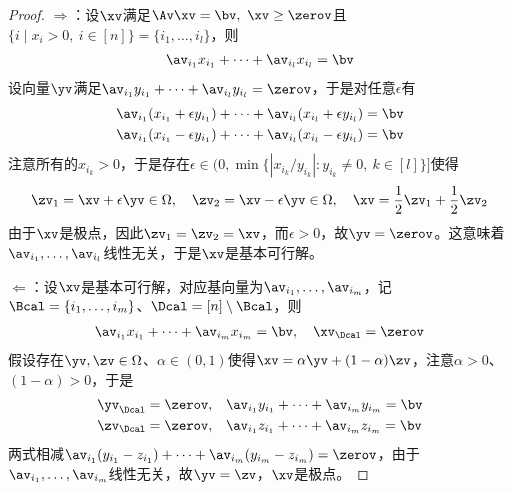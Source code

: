\documentclass{ctexart}
\begin{document}
\begin{proof}
    $\Rightarrow$：设$\xv$满足$\Av \xv = \bv, ~ \xv \ge \zerov$且$\{ i \mid x_i > 0, ~ i \in [n] \} = \{ i_1, \ldots, i_l \}$，则
    \begin{align*}
        \av_{i_1} x_{i_1} + \cdots + \av_{i_l} x_{i_l} = \bv
    \end{align*}
    设向量$\yv$满足$\av_{i_1} y_{i_1} + \cdots + \av_{i_l} y_{i_l} = \zerov$，于是对任意$\epsilon$有
    \begin{align*}
        \av_{i_1} (x_{i_1} + \epsilon y_{i_1}) + \cdots + \av_{i_l} (x_{i_l} + \epsilon y_{i_l}) & = \bv \\
        \av_{i_1} (x_{i_1} - \epsilon y_{i_1}) + \cdots + \av_{i_l} (x_{i_l} - \epsilon y_{i_l}) & = \bv
    \end{align*}
    注意所有的$x_{i_k}>0$，于是存在$\epsilon \in (0, \min\{ | x_{i_k} / y_{i_k} | : y_{i_k} \ne 0, ~ k \in [l] \}]$使得
    \begin{align*}
        \zv_1 = \xv + \epsilon \yv \in \Omega, \quad \zv_2 = \xv - \epsilon \yv \in \Omega, \quad \xv = \frac{1}{2} \zv_1 + \frac{1}{2} \zv_2
    \end{align*}
    由于$\xv$是极点，因此$\zv_1 = \zv_2 = \xv$，而$\epsilon > 0$，故$\yv = \zerov$。这意味着$\av_{i_1}, \ldots, \av_{i_l}$线性无关，于是$\xv$是基本可行解。

    $\Leftarrow$：设$\xv$是基本可行解，对应基向量为$\av_{i_1}, \ldots, \av_{i_m}$，记$\Bcal = \{i_1, \ldots, i_m\}$、$\Dcal = [n] \setminus \Bcal$，则
    \begin{align*}
        \av_{i_1} x_{i_1} + \cdots + \av_{i_m} x_{i_m} = \bv, \quad \xv_\Dcal = \zerov
    \end{align*}
    假设存在$\yv, \zv \in \Omega$、$\alpha \in (0,1)$使得$\xv = \alpha \yv + (1 - \alpha)\zv$，注意$\alpha > 0$、$(1- \alpha) > 0$，于是
    \begin{align*}
        \yv_\Dcal = \zerov, \quad & \av_{i_1} y_{i_1} + \cdots + \av_{i_m} y_{i_m} = \bv \\
        \zv_\Dcal = \zerov, \quad & \av_{i_1} z_{i_1} + \cdots + \av_{i_m} z_{i_m} = \bv
    \end{align*}
    两式相减$\av_{i_1} (y_{i_1} - z_{i_1}) + \cdots + \av_{i_m} (y_{i_m} - z_{i_m}) = \zerov$，由于$\av_{i_1}, \ldots, \av_{i_m}$线性无关，故$\yv = \zv$，$\xv$是极点。
\end{proof}
\end{document}
